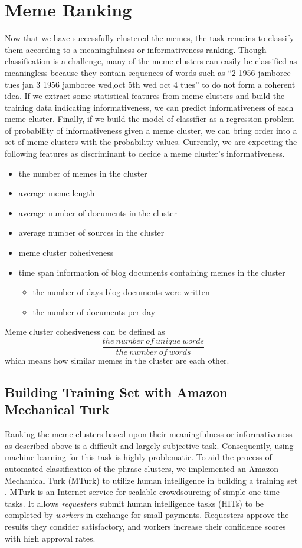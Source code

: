 \documentclass{sig-alternate}
\begin{document}
\section{Meme Ranking}
Now that we have successfully clustered the memes, the task remains to classify them according to a meaningfulness or informativeness ranking. Though classification is a challenge, many of the meme clusters can easily be classified as meaningless because they contain sequences of words such as “2 1956 jamboree tues jan 3 1956 jamboree wed,oct 5th wed oct 4 tues” to do not form a coherent idea. If we extract some statistical features from meme clusters and build the training data indicating informativeness, we can predict informativeness of each meme cluster. Finally, if we build the model of classifier as a regression problem of probability of informativeness given a meme cluster, we can bring order into a set of meme clusters with the probability values. Currently, we are expecting the following features as discriminant to decide a meme cluster's informativeness.
\begin{itemize}
 \item the number of memes in the cluster
 \item average meme length
 \item average number of documents in the cluster
 \item average number of sources in the cluster
 \item meme cluster cohesiveness
 \item time span information of blog documents containing memes in the cluster
  \begin{itemize}
    \item the number of days blog documents were written
    \item the number of documents per day
  \end{itemize}
\end{itemize}
Meme cluster cohesiveness can be defined as 
\begin{displaymath}
\frac{the\ number\ of\ unique\ words}{the\ number\ of\ words}
\end{displaymath}
which means how similar memes in the cluster are each other.

\subsection{Building Training Set with Amazon Mechanical Turk}

Ranking the meme clusters based upon their meaningfulness or informativeness as described above is a difficult and largely subjective task. Consequently, using machine learning for this task is highly problematic. To aid the process of automated classification of the phrase clusters, we implemented an Amazon Mechanical Turk (MTurk) to utilize human intelligence in building a training set \cite{Barr2006}. MTurk is an Internet service for scalable crowdsourcing of simple one-time tasks. It allows \emph{requesters} submit human intelligence tasks (HITs) to be completed by \emph{workers} in exchange for small payments. Requesters approve the results they consider satisfactory, and workers increase their confidence scores with high approval rates.
\end{document}
